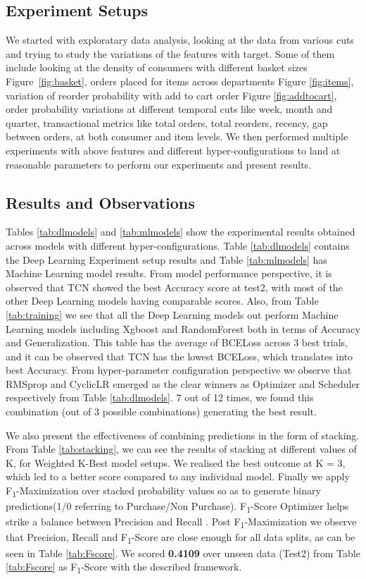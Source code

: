 \subsection{Experiment Setups}
We started with exploratary data analysis, looking at the data from various cuts and 
trying to study the variations of the features with target. Some of them include looking at the 
density of consumers with different basket sizes Figure~\ref{fig:basket}, orders placed for items 
across departments Figure \ref{fig:items}, variation of reorder probability with add to cart order Figure \ref{fig:addtocart},
order probability variations at different temporal cuts like week, month and quarter, transactional metrics 
like total orders, total reorders, recency, gap between orders, at both consumer and item levels.
We then performed multiple experiments with above features and different hyper-configurations to land at reasonable 
parameters to perform our experiments and present results.

\subsection{Results and Observations}
Tables \ref{tab:dlmodels} and \ref{tab:mlmodels} show the experimental results obtained across models with different 
hyper-configurations. Table \ref{tab:dlmodels} contains the Deep Learning Experiment setup results
and Table \ref{tab:mlmodels} has Machine Learning model results. From model performance perspective, it is observed that 
TCN showed the best Accuracy score at test2, with most of the other Deep Learning models having comparable scores.
Also, from Table \ref{tab:training} we see that all the Deep Learning models out perform Machine Learning models 
including Xgboost and RandomForest both in terms of Accuracy and Generalization. This table has the average of 
BCELoss across 3 best trials, and it can be observed that TCN has the lowest BCELoss, which translates into
best Accuracy. From hyper-parameter configuration perspective we observe that RMSprop and CyclicLR emerged as the 
clear winners as Optimizer and Scheduler respectively from Table \ref{tab:dlmodels}. 7 out of 12 times, we 
found this combination (out of 3 possible combinations) generating the best result.

We also present the effectiveness of combining predictions in the form of stacking. From Table \ref{tab:stacking}, we can see the 
results of stacking at different values of K, for Weighted K-Best model setups. We realised the best outcome at 
K = 3, which led to a better score compared to any individual model.
Finally we apply F\textsubscript{1}-Maximization over stacked probability values so as to generate 
binary predictions(1/0 referring to Purchase/Non Purchase). F\textsubscript{1}-Score Optimizer helps strike a 
balance between Precision and Recall \cite{buckland1994relationship}. Post F\textsubscript{1}-Maximization we 
observe that Precision, Recall and F\textsubscript{1}-Score are close enough for all data splits, as can be seen 
in Table \ref{tab:Fscore}. We scored {\bf 0.4109} over unseen data (Test2)
from Table \ref{tab:Fscore} as F\textsubscript{1}-Score with the described framework.
